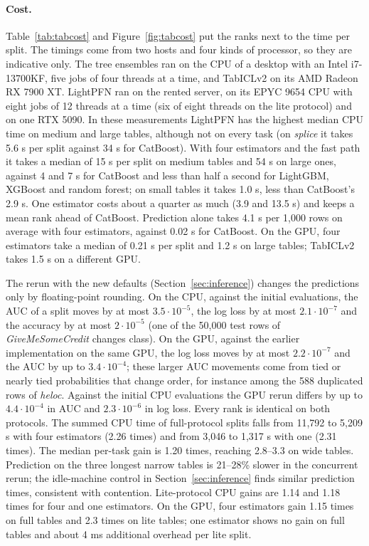 \documentclass[11pt]{article}
\begin{document}
\paragraph{Cost.} Table~\ref{tab:tabcost} and Figure~\ref{fig:tabcost} put the ranks next to the time per split.
The timings come from two hosts and four kinds of processor, so they are indicative only. The tree ensembles
ran on the CPU of a desktop with an Intel i7-13700KF, five jobs of four threads at a time, and TabICLv2 on its AMD
Radeon RX 7900 XT. LightPFN ran on the rented server, on its EPYC 9654 CPU with eight jobs of 12 threads at a time
(six of eight threads on the lite protocol) and on one RTX 5090. In these measurements LightPFN has the highest
median CPU time on medium and large tables, although not on every task (on \emph{splice} it takes 5.6 s per split
against 34 s for CatBoost). With four estimators and the
fast path it takes a median of 15 s per split on medium tables and 54 s on large ones, against 4 and 7 s for
CatBoost and less than half a second for LightGBM, XGBoost and random forest; on small tables it takes 1.0 s,
less than CatBoost's 2.9 s. One estimator costs about a quarter as much (3.9 and 13.5 s) and keeps a mean rank
ahead of CatBoost. Prediction alone takes 4.1 s per 1,000 rows on average with four estimators, against 0.02 s for
CatBoost. On the GPU, four estimators take a median of 0.21 s per split and 1.2 s on large tables; TabICLv2 takes
1.5 s on a different GPU.

The rerun with the new defaults (Section~\ref{sec:inference}) changes the predictions only by floating-point
rounding. On the CPU, against the initial evaluations, the AUC of a split moves by at most $3.5\cdot10^{-5}$, the log
loss by at most $2.1\cdot10^{-7}$ and the accuracy by at most $2\cdot10^{-5}$ (one of the 50,000 test rows of
\emph{GiveMeSomeCredit} changes class). On the GPU, against the earlier implementation on the same GPU, the log
loss moves by at most $2.2\cdot10^{-7}$ and the AUC by up to $3.4\cdot10^{-4}$; these larger AUC movements come
from tied or nearly tied probabilities that change order, for instance among the 588 duplicated rows of
\emph{heloc}. Against the initial CPU evaluations the GPU rerun differs by up to $4.4\cdot10^{-4}$ in AUC and
$2.3\cdot10^{-6}$ in log loss. Every rank is identical on both protocols. The summed CPU time of full-protocol
splits falls from 11,792 to 5,209 s with four estimators (2.26 times) and from 3,046 to 1,317 s with one
(2.31 times). The median per-task gain is 1.20 times, reaching 2.8--3.3 on wide tables. Prediction on the
three longest narrow tables is 21--28\% slower in the concurrent rerun; the idle-machine control in
Section~\ref{sec:inference} finds similar prediction times, consistent with contention. Lite-protocol CPU
gains are 1.14 and 1.18 times for four and one estimators. On the GPU, four estimators gain 1.15 times on
full tables and 2.3 times on lite tables; one estimator shows no gain on full tables and about 4 ms
additional overhead per lite split.
\end{document}
